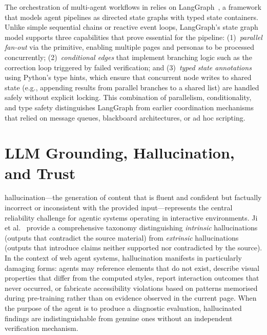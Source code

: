 The orchestration of multi-agent workflows in \versimux{} relies on LangGraph~\cite{langgraph}, a framework that models agent pipelines as directed state graphs with typed state containers. Unlike simple sequential chains or reactive event loops, LangGraph's state graph model supports three capabilities that prove essential for the \versimux{} pipeline: (1)~\textit{parallel fan-out} via the  primitive, enabling multiple pages and personas to be processed concurrently; (2)~\textit{conditional edges} that implement branching logic such as the correction loop triggered by failed verification; and (3)~\textit{typed state annotations} using Python's  type hints, which ensure that concurrent node writes to shared state (e.g., appending results from parallel branches to a shared list) are handled safely without explicit locking. This combination of parallelism, conditionality, and type safety distinguishes LangGraph from earlier  coordination mechanisms that relied on message queues, blackboard architectures, or ad hoc scripting.


\section{LLM Grounding, Hallucination, and Trust}
\label{sec:bg-grounding}

 hallucination---the generation of content that is fluent and confident but factually incorrect or inconsistent with the provided input---represents the central reliability challenge for agentic systems operating in interactive environments. Ji et al.~\cite{ji2023hallucination} provide a comprehensive taxonomy distinguishing \textit{intrinsic} hallucinations (outputs that contradict the source material) from \textit{extrinsic} hallucinations (outputs that introduce claims neither supported nor contradicted by the source). In the context of web agent systems, hallucination manifests in particularly damaging forms: agents may reference  elements that do not exist, describe visual properties that differ from the computed styles, report interaction outcomes that never occurred, or fabricate accessibility violations based on patterns memorised during pre-training rather than on evidence observed in the current page. When the purpose of the agent is to produce a diagnostic evaluation, hallucinated findings are indistinguishable from genuine ones without an independent verification mechanism.

